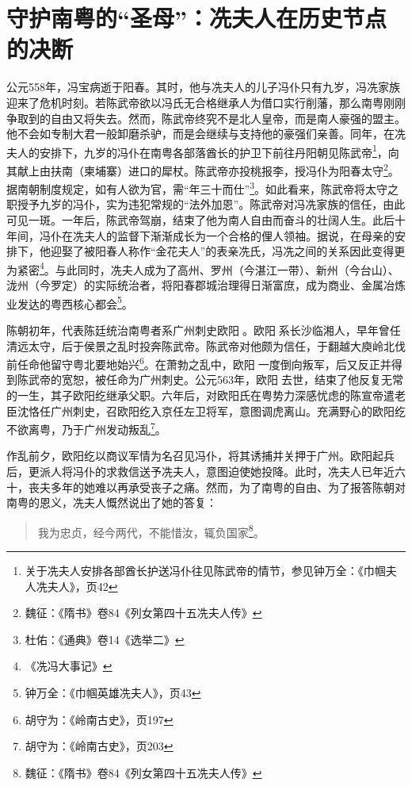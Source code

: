 \section{守护南粤的“圣母”：冼夫人在历史节点的决断}

\indent 公元558年，冯宝病逝于阳春。其时，他与冼夫人的儿子冯仆只有九岁，冯冼家族迎来了危机时刻。若陈武帝欲以冯氏无合格继承人为借口实行削藩，那么南粤刚刚争取到的自由又将失去。然而，陈武帝终究不是北人皇帝，而是南人豪强的盟主。他不会如专制大君一般卸磨杀驴，而是会继续与支持他的豪强们亲善。同年，在冼夫人的安排下，九岁的冯仆在南粤各部落酋长的护卫下前往丹阳朝见陈武帝\footnote{关于冼夫人安排各部酋长护送冯仆往见陈武帝的情节，参见钟万全：《巾帼夫人冼夫人》，页42}，向其献上由扶南（柬埔寨）进口的犀杖。陈武帝亦投桃报李，授冯仆为阳春太守\footnote{魏征：《隋书》卷84《列女第四十五冼夫人传》}。据南朝制度规定，如有人欲为官，需“年三十而仕”\footnote{杜佑：《通典》卷14《选举二》}。如此看来，陈武帝将太守之职授予九岁的冯仆，实为违犯常规的“法外加恩”。陈武帝对冯冼家族的信任，由此可见一斑。一年后，陈武帝驾崩，结束了他为南人自由而奋斗的壮阔人生。此后十年间，冯仆在冼夫人的监督下渐渐成长为一个合格的俚人领袖。据说，在母亲的安排下，他迎娶了被阳春人称作“金花夫人”的表亲冼氏，冯冼之间的关系因此变得更为紧密\footnote{《冼冯大事记》}。与此同时，冼夫人成为了高州、罗州（今湛江一带）、新州（今台山）、泷州（今罗定）的实际统治者，将阳春郡城治理得日渐富庶，成为商业、金属冶炼业发达的粤西核心都会\footnote{钟万全：《巾帼英雄冼夫人》，页43}。

陈朝初年，代表陈廷统治南粤者系广州刺史欧阳。欧阳系长沙临湘人，早年曾任清远太守，后于侯景之乱时投奔陈武帝。陈武帝对他颇为信任，于翻越大庾岭北伐前任命他留守粤北要地始兴\footnote{胡守为：《岭南古史》，页197}。在萧勃之乱中，欧阳一度倒向叛军，后又反正并得到陈武帝的宽恕，被任命为广州刺史。公元563年，欧阳去世，结束了他反复无常的一生，其子欧阳纥继承父职。六年后，对欧阳氏在粤势力深感忧虑的陈宣帝遣老臣沈恪任广州刺史，召欧阳纥入京任左卫将军，意图调虎离山。充满野心的欧阳纥不欲离粤，乃于广州发动叛乱\footnote{胡守为：《岭南古史》，页203}。

作乱前夕，欧阳纥以商议军情为名召见冯仆，将其诱捕并关押于广州。欧阳起兵后，更派人将冯仆的求救信送予冼夫人，意图迫使她投降。此时，冼夫人已年近六十，丧夫多年的她难以再承受丧子之痛。然而，为了南粤的自由、为了报答陈朝对南粤的恩义，冼夫人慨然说出了她的答复：

\begin{quote}
	我为忠贞，经今两代，不能惜汝，辄负国家\footnote{魏征：《隋书》卷84《列女第四十五冼夫人传》}。
\end{quote}

